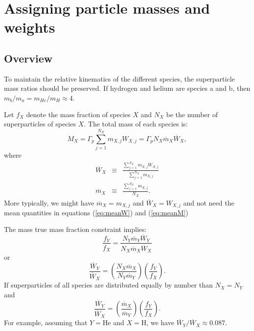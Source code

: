 \documentclass[12pt]{article}
\begin{document}
\section{Assigning particle masses and weights}

\subsection{Overview}

To maintain the relative kinematics of the different species, the
superparticle mass ratios should be preserved.  If hydrogen and helium
are species a and b, then $m_b/m_a = m_{He}/m_H \approx 4$.

Let $f_X$ denote the mass fraction of species $X$ and $N_X$ be the
number of superparticles of species $X$.  The total mass of each
species is:
\begin{equation}
  M_X = \Gamma_p \sum_{j=1}^{N_X} m_{X,j} W_{X,j} = 
  \Gamma_p N_X \overline{m}_{X} \overline{W}_{X},
\end{equation}
where 
\begin{eqnarray}
  \overline{W}_X &\equiv& \frac{\sum_{j=1}^{N_X} m_{X,j}
    W_{X,j}}{\sum_{j=1}^{N_X} m_{X,j}} \label{eq:meanW} \\
  \overline{m}_X &\equiv& \frac{\sum_{j=1}^{N_X} m_{X,j}}{N_X}.
  \label{eq:meanM}
\end{eqnarray}
More typically, we might have $\overline{m}_{X} = m_{X,j}$ and $\overline{W}_{X}
= W_{X,j}$ and not need the mean quantities in equations
(\ref{eq:meanW}) and  (\ref{eq:meanM})

The mass true mass fraction constraint implies:
\begin{equation}
\frac{f_Y}{f_X} = \frac{N_Y \overline{m}_{Y} \overline{W}_{Y}}{N_X \overline{m}_{X} \overline{W}_{X}}
\end{equation}
or
\begin{equation}
\frac{\overline{W}_{Y}}{\overline{W}_{X}} = 
\left(\frac{N_X \overline{m}_{X}}{N_Y \overline{m}_{Y}}\right)
\left(\frac{f_Y}{f_X}\right).
\end{equation}
If superparticles of all species are distributed equally by number
than $N_X=N_Y$ and
\begin{equation}
\frac{\overline{W}_{Y}}{\overline{W}_{X}} = 
\left(\frac{\overline{m}_{X}}{\overline{m}_{Y}}\right)
\left(\frac{f_Y}{f_X}\right).
\end{equation}
For example, assuming that $Y=\mbox{He}$ and $X=\mbox{H}$, we have
$\overline{W}_Y/\overline{W}_X \approx 0.087$.
\end{document}
